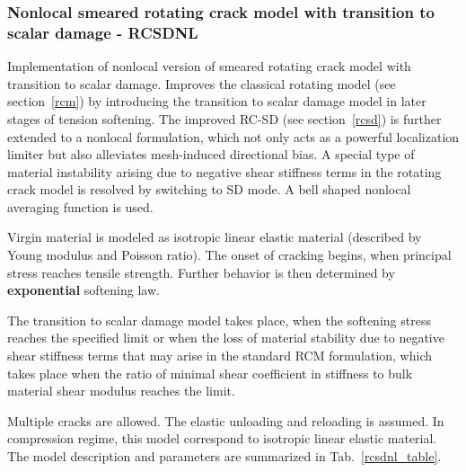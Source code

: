 \documentclass[a4paper]{article}
\begin{document}
\subsubsection{Nonlocal smeared rotating crack model with transition to scalar damage - RCSDNL}
\label{rcsdnl}
Implementation of nonlocal version of smeared rotating crack model with transition to
scalar damage.
Improves the classical rotating model (see
section~\ref{rcm}) by introducing the transition to scalar damage
model in  later stages of tension softening.
The improved RC-SD (see section~\ref{rcsd}) is further extended to a
nonlocal formulation, which not only acts as a powerful localization
limiter but also alleviates mesh-induced directional bias. A special
type of material instability arising due to negative shear stiffness
terms in the rotating crack model is resolved by switching to SD mode. A bell shaped nonlocal
averaging function is used.

Virgin material is modeled as isotropic linear elastic material
(described by Young modulus and Poisson
ratio). The onset of cracking begins, when principal stress reaches
tensile strength.
Further behavior is then determined by {\bf exponential} softening law.

The transition to scalar damage model
takes place, when the softening stress reaches the specified limit or
when the loss of material stability due to negative shear stiffness
terms that may arise in the standard RCM formulation, which takes
place when the ratio of minimal shear coefficient in stiffness to
bulk material shear modulus reaches the limit.

Multiple cracks are allowed.
The elastic unloading and reloading is assumed.
In compression regime, this model correspond to isotropic linear elastic material.
The model description and parameters are summarized
in Tab.~\ref{rcsdnl_table}.
\end{document}
